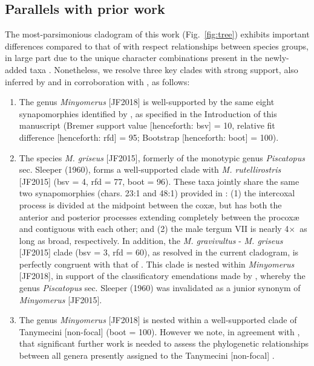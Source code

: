 \documentclass[fleqn,10pt,lineno]{wlpeerj} %
\newcommand{\x}{$\times$~}
\begin{document}
	\subsection*{Parallels with prior work}\label{ssec:same}
		The most-parsimonious cladogram of this work (Fig.~\ref{fig:tree}) exhibits important differences compared to that of \citet{jansen2015} with respect relationships between species groups, in large part due to the unique character combinations present in the newly-added taxa \citep{rieppel2007, franz2014}.
		Nonetheless, we resolve three key clades with strong support, also inferred by and in corroboration with \citet{jansen2015}, as follows:
		\begin{enumerate}
			\item The genus \textit{Minyomerus} [JF2018] is well-supported by the same eight synapomorphies identified by \citet{jansen2015}, as specified in the Introduction of this manuscript (Bremer support value [henceforth: bsv] = 10, relative fit difference [henceforth: rfd] = 95; Bootstrap [henceforth: boot] = 100).
			\item The species \textit{M. griseus} [JF2015], formerly of the monotypic genus \textit{Piscatopus} sec. Sleeper (1960), forms a well-supported clade with \textit{M. rutellirostris} [JF2015] (bsv = 4, rfd = 77, boot = 96). These taxa jointly share the same two synapomorphies (chars. 23:1 and 48:1) provided in \citet{jansen2015}: (1) the intercoxal process is divided at the midpoint between the cox{\ae}, but has both the anterior and posterior processes extending completely between the procox{\ae} and contiguous with each other; and (2) the male tergum VII is nearly 4\x as long as broad, respectively. In addition, the \textit{M. gravivultus} - \textit{M. griseus} [JF2015] clade (bsv = 3, rfd = 60), as resolved in the current cladogram, is perfectly congruent with that of \citet{jansen2015}. This clade is nested within \textit{Minyomerus} [JF2018], in support of the classificatory emendations made by \citet{jansen2015}, whereby the genus \textit{Piscatopus} sec. Sleeper (1960) was invalidated as a junior synonym of \textit{Minyomerus} [JF2015].
			\item The genus \textit{Minyomerus} [JF2018] is nested within a well-supported clade of Tanymecini [non-focal] (boot = 100). However we note, in agreement with \citet{jansen2015}, that significant further work is needed to assess the phylogenetic relationships between all genera presently assigned to the Tanymecini [non-focal] \citep{alonso1999}.
		\end{enumerate}
	
\end{document}
